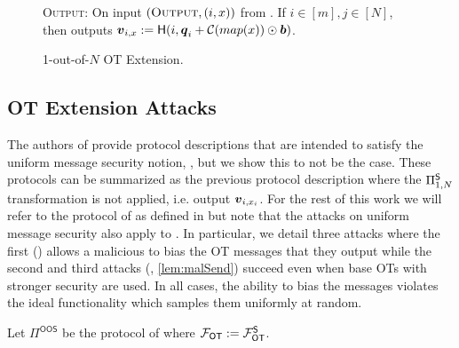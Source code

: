 \begin{figure}[t!]
{\begin{minipage}{0.95\linewidth}
			
			\textsc{Output:} On input $(\textsc{Output}, (i,x))$ from \send. If $i\in[m],j\in[N]$, then \send outputs $\boldsymbol{v}_{i,x}:=\mathsf{H}(i,\boldsymbol{q}_i+\mathcal{C}(map(x))\odot \boldsymbol{b})$.
	\end{minipage}}
	\caption{ 1-out-of-$N$ OT Extension.}
	\label{fig:otExt}
\end{figure}


%			


\subsection{OT Extension Attacks}\label{sec:extAttack}


The authors of \cite{C:KelOrsSch15,RSA:OrrOrsSch17} provide protocol descriptions that are intended to satisfy the uniform message security notion, , but we show this to not be the case. These protocols can be summarized as the previous protocol description where the $\Pi^{\mathsf{S}}_{1,N}$ transformation is not applied, i.e. output $\boldsymbol{v}_{i,x_i}$.  For the rest of this work we will refer to the protocol of \cite{RSA:OrrOrsSch17} as defined in  but note that the attacks on uniform message security also apply to \cite[Figure 6, 7]{C:KelOrsSch15}. In particular, we detail three attacks where the first ()  allows a malicious \rec to bias the OT messages that they output while the second and third attacks (, \ref{lem:malSend}) succeed even when base OTs with stronger security are used. In all cases, the ability to bias the messages violates the ideal functionality which samples them uniformly at random.


\begin{definition}\label{def:OOS}
	Let $\Pi^{\textsf{OOS}}$ be the protocol of  where $\mathcal{F}_{\mathsf{OT}}:=\mathcal{F}_{\mathsf{OT}}^\mathsf{S}$.
\end{definition}

